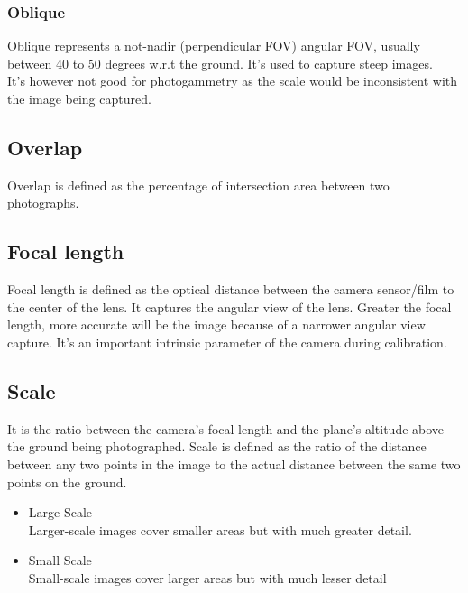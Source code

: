 \documentclass[11pt,twocolumn,letterpaper]{article}
\begin{document}
\subsubsection{Oblique}
Oblique represents a not-nadir (perpendicular FOV) angular FOV, usually between 40 to 50 degrees w.r.t the ground. It's used to capture steep images. 
\\ It's however not good for photogammetry as the scale would be inconsistent with the image being captured.

\subsection{Overlap}
 
 Overlap is defined as the percentage of intersection area between two photographs. 


\subsection{Focal length}

Focal length is defined as the optical distance between the camera sensor/film to the center of the lens. It captures the angular view of the lens.  Greater the focal length, more accurate will be the image because of a narrower angular view capture. It's an important intrinsic parameter of the camera during calibration.

\subsection{Scale}
It is the ratio between the camera's focal length and the plane's altitude above the ground being photographed.
Scale is defined as the ratio of the distance between any two points in the image to the actual distance between the same two points on the ground.

\begin{itemize}
    \item Large Scale 
    \\ Larger-scale images cover smaller areas but with much greater detail.
    \item Small Scale
    \\ Small-scale images cover larger areas but with much lesser detail

\end{itemize}
\end{document}

